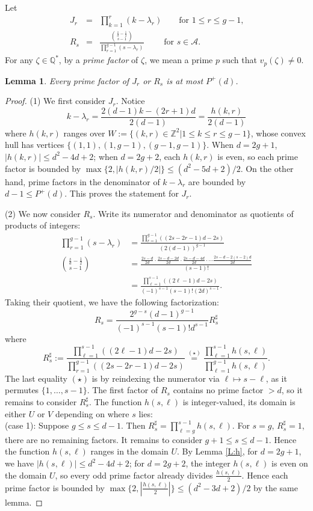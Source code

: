 \documentclass{amsart}
\theoremstyle{plain}
\newtheorem{lemma}[theorem]{Lemma}
\theoremstyle{remark}
\theoremstyle{remark}
\newcommand{\cA}{\mathcal{A}}
\newcommand{\0}{\mathbf{0}}
\newcommand{\1}{\mathbf{1}}
\newcommand{\Q}{\mathbb{Q}}
\newcommand{\Z}{\mathbb{Z}}
\newcommand{\Rsd}{R_s^{\sharp}}
\begin{document}
Let
\begin{eqnarray*}
J_r&=&\prod_{k=1}^r(k-\lambda_r) \qquad \mbox{for $1\le r\le g-1$,}\\
R_s &=&\frac{\binom{\frac{s}{d}-\frac{1}{2}}{s-1}}{\prod_{r=1}^{g-1}(s-\lambda_r)}\qquad \mbox{ for $s\in \cA$}.
\end{eqnarray*}
For any $\zeta\in\Q^*$, by a {\it prime factor} of $\zeta$, 
we mean a prime $p$ such that $v_p(\zeta)\ne 0$.


\begin{lemma}\label{L:prime}
Every prime factor of
$J_r$ or $R_s$ 
is at most $P^+(d)$.
\end{lemma}

\begin{proof}
(1) We first consider $J_r$.
Notice
$$
k-\lambda_r=\frac{2(d-1)k-(2r+1)d}{2(d-1)}=\frac{h(k,r)}{2(d-1)}
$$
where $h(k,r)$ ranges over 
$W:=\{(k,r)\in\Z^2| 1\le k\le r\le g-1\}$, whose convex hull has  
vertices $\{(1,1), (1,g-1), (g-1,g-1)\}$.
When $d=2g+1$,  $|h(k,r)|\le d^2-4d+2$;  
when $d=2g+2$, each $h(k,r)$ is even, so each prime factor is bounded by 
 $\max\{2,|h(k,r)/2|\}\le (d^2-5d+2)/2$.
On the other hand, prime factors in the denominator of $k-\lambda_r$ are bounded by 
$d-1\le P^+(d)$.
This proves the statement for $J_r$.

(2) We now consider $R_s$.
Write its numerator and denominator 
as  quotients of products of integers:
\begin{align*}
\prod_{r=1}^{g-1}(s-\lambda_r)
&=\frac{\prod_{r=1}^{g-1} ((2s-2r-1)d-2s)}{(2(d-1))^{g-1}}\\
\binom{\frac{s}{d}-\frac{1}{2}}{s-1}&=\frac{\frac{2s-d}{2d}\cdot
\frac{2s-d-2d}{2d}\cdot \frac{2s-d-4d}{2d} \cdot
\cdots \frac{2s-d-2(s-2)d}{2d}}{(s-1)!}\nonumber\\
&=\frac{\prod_{\ell=1}^{s-1}((2\ell-1)d-2s)}{(-1)^{s-1}(s-1)!(2d)^{s-1}}.
\end{align*}
Taking their quotient, we have the following factorization:
$$
R_s = \frac{2^{g-s}(d-1)^{g-1}}{(-1)^{s-1}(s-1)!d^{s-1}}\Rsd
$$
where
\begin{equation*}
\Rsd:=\frac{\prod_{\ell=1}^{s-1}((2\ell-1)d-2s)}{\prod_{r=1}^{g-1} ((2s-2r-1)d-2s)}
\stackrel{(\star)}{=}
\frac{\prod_{\ell=1}^{s-1}h(s,\ell)}{\prod_{\ell=1}^{g-1}h(s,\ell)}.
\end{equation*}
The last equality $(\star)$ is by
reindexing the numerator via $\ell\mapsto s-\ell$, 
as it permutes $\{1,\ldots,s-1\}$.
The first factor of $R_s$ contains no prime factor $>d$,
so it remains to consider $\Rsd$.
The function $h(s,\ell)$ is integer-valued, 
its domain is either $U$ or $V$ depending on where $s$ lies:\\
\noindent 
(case 1): Suppose $g\le s\le d-1$. 
Then 
$\Rsd=\prod_{\ell=g}^{s-1}h(s,\ell).
$
For $s=g$, $\Rsd=1$, there are no remaining factors. 
It remains to consider $g+1\le s\le d-1$. Hence the function $h(s,\ell)$ ranges in the domain $U$. By Lemma \ref{L:h},
for $d=2g+1$, we have $|h(s,\ell)|\le d^2-4d+2$;
for $d=2g+2$, the integer $h(s,\ell)$ is even on the domain $U$, 
so every odd prime factor already divides $\frac{h(s,\ell)}{2}$.
Hence each prime factor is bounded by $\max\{2,|\frac{h(s,\ell)}{2}|\}
\le (d^2-3d+2)/2$ 
by the same lemma.
  

\end{proof}
\end{document}
